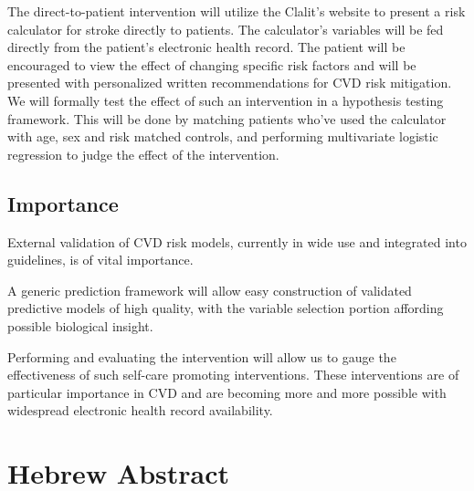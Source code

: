 \documentclass[a4paper,12pt]{article}
\begin{document}
		The direct-to-patient intervention will utilize the Clalit's website to present a risk calculator for stroke directly to patients. The calculator's variables will be fed directly from the patient's electronic health record. The patient will be encouraged to view the effect of changing specific risk factors and will be presented with personalized written recommendations for CVD risk mitigation. We will formally test the effect of such an intervention in a hypothesis testing framework. This will be done by matching patients who've used the calculator with age, sex and risk matched controls, and performing multivariate logistic regression to judge the effect of the intervention.
		
		\subsection{Importance}
		External validation of CVD risk models, currently in wide use and integrated into guidelines, is of vital importance\cite{Moons2012}.
		
		A generic prediction framework will allow easy construction of validated predictive models of high quality, with the variable selection portion affording possible biological insight.
		
		Performing and evaluating the intervention will allow us to gauge the effectiveness of such self-care promoting interventions. These interventions are of particular importance in CVD\cite{Riegel2017} and are becoming more and more possible with widespread electronic health record availability.
	
	
	\section{Hebrew Abstract}
	
\end{document}
